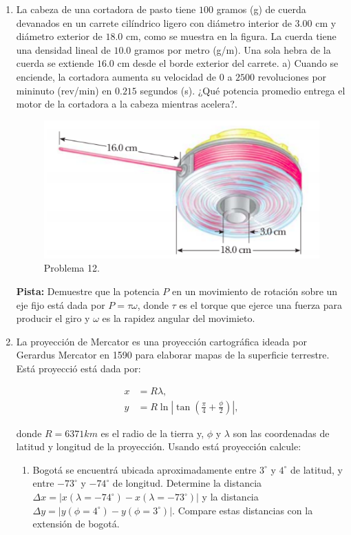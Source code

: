 \documentclass{article}
\begin{document}
\begin{enumerate}
\item La cabeza de una cortadora de pasto tiene $100$ gramos (g) de cuerda devanados en un carrete cilíndrico ligero con diámetro interior de $3$.$00$ cm y diámetro exterior de $18$.$0$ cm, como se muestra en la figura. La cuerda tiene una densidad lineal de $10$.$0$ gramos por metro (g/m). Una sola hebra de la cuerda se extiende $16$.$0$ cm desde el borde exterior del carrete. a) Cuando se enciende, la cortadora aumenta su velocidad de $0$ a $2500$ revoluciones por mininuto (rev/min) en $0$.$215$ segundos (s). ¿Qué potencia promedio entrega el motor de la cortadora a la cabeza mientras acelera?.


\begin{figure}[H]
\centering
\includegraphics[scale=0.4]{problema_12.png}
\caption{Problema 12.}
\end{figure}

\textbf{Pista:} Demuestre que la potencia $P$ en un movimiento de rotación sobre un eje fijo está dada por $P=\tau\omega$, donde $\tau$ es el torque que ejerce una fuerza para producir el giro y $\omega$ es la rapidez angular del movimieto.

\item La proyección de Mercator es una proyección cartográfica ideada por Gerardus Mercator en 1590 para elaborar mapas de la superficie terrestre. Está proyecció está dada por:

\begin{align*}
x&=R\lambda, \\
y&=R\ln\left|\tan\left(\frac{\pi}{4}+\frac{\phi}{2}\right)\right|,
\end{align*}

donde $R=6371km$ es el radio de la tierra y, $\phi$ y  $\lambda$ son las coordenadas de latitud y longitud de la proyección. Usando está proyección calcule:

\begin{enumerate}
\item Bogotá se encuentrá ubicada aproximadamente entre $3^{\circ}$ y $4^{\circ}$ de latitud, y entre $-73^{\circ}$ y $-74^{\circ}$ de longitud. Determine la distancia $\Delta x=|x(\lambda=-74^{\circ})-x(\lambda=-73^{\circ})|$ y la distancia\\
\noindent $\Delta y=|y(\phi=4^{\circ})-y(\phi=3^{\circ})|$. Compare estas distancias con la extensión de bogotá.
\end{enumerate}


\end{enumerate}
\end{document}
